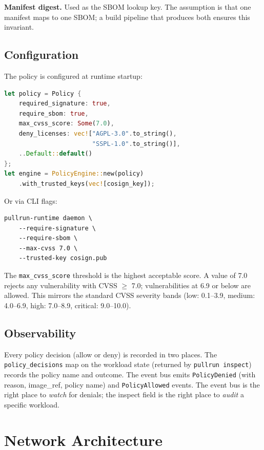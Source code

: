 \documentclass[11pt,a4paper]{article}
\begin{document}
\textbf{Manifest digest.} Used as the SBOM lookup key. The assumption is that one manifest maps to one SBOM; a build pipeline that produces both ensures this invariant.

\subsection{Configuration}

The policy is configured at runtime startup:

\begin{lstlisting}[language=Rust]
let policy = Policy {
    required_signature: true,
    require_sbom: true,
    max_cvss_score: Some(7.0),
    deny_licenses: vec!["AGPL-3.0".to_string(), 
                        "SSPL-1.0".to_string()],
    ..Default::default()
};
let engine = PolicyEngine::new(policy)
    .with_trusted_keys(vec![cosign_key]);
\end{lstlisting}

Or via CLI flags:
\begin{verbatim}
pullrun-runtime daemon \
    --require-signature \
    --require-sbom \
    --max-cvss 7.0 \
    --trusted-key cosign.pub
\end{verbatim}

The \texttt{max\_cvss\_score} threshold is the highest acceptable score. A value of 7.0 rejects any vulnerability with CVSS $\geq$ 7.0; vulnerabilities at 6.9 or below are allowed. This mirrors the standard CVSS severity bands (low: 0.1--3.9, medium: 4.0--6.9, high: 7.0--8.9, critical: 9.0--10.0).

\subsection{Observability}

Every policy decision (allow or deny) is recorded in two places. The \texttt{policy\_decisions} map on the workload state (returned by \texttt{pullrun inspect}) records the policy name and outcome. The event bus emits \texttt{PolicyDenied} (with reason, image\_ref, policy name) and \texttt{PolicyAllowed} events. The event bus is the right place to \emph{watch} for denials; the inspect field is the right place to \emph{audit} a specific workload.

\section{Network Architecture}\label{sec:network}
\end{document}
